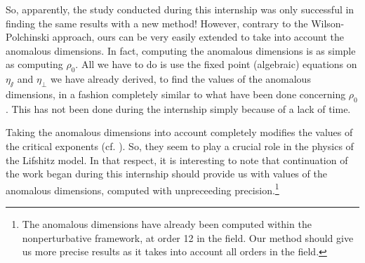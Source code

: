 So, apparently, the study conducted during this internship was only successful in finding the same results with a new method!
However, contrary to the Wilson-Polchinski approach, ours can be very easily extended to take into account the anomalous dimensions. In fact, computing the anomalous dimensions is as simple as computing $\rho_0$. All we have to do is use the fixed point (algebraic) equations on $\eta_\sslash$ and $\eta_\perp$ we have already derived, to find the values of the anomalous dimensions, in a fashion completely similar to what have been done concerning $\rho_0$. This has not been done during the internship simply because of a lack of time.

Taking the anomalous dimensions into account completely modifies the values of the critical exponents (cf. \cite{MouhannaLif}). So, they seem to play a crucial role in the physics of the Lifshitz model. 
In that respect, it is interesting to note that continuation of the work began during this internship should provide us with values of the anomalous dimensions, computed with unpreceeding precision.\footnote{The anomalous dimensions have already been computed within the nonperturbative framework, at order 12 in the field. Our method should give us more precise results as it takes into account all orders in the field.}